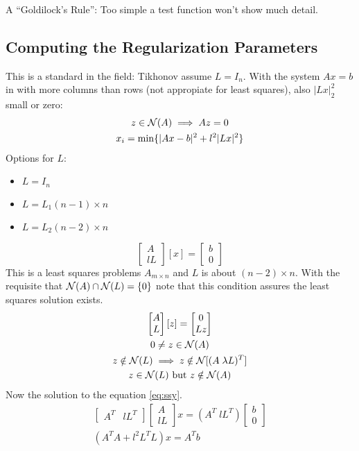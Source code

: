 A ``Goldilock's Rule'': Too simple a test function won't show much detail.\\
\subsection{Computing the Regularization Parameters}
This is a standard in the field: Tikhonov assume $L=I_n$. With the system $Ax=b$in with more columns than rows (not appropiate for least squares), also $|Lx|_2^2$ small or zero:
\begin{gather*}
z\in \mathcal{N}(A) \implies Az=0\\
x_i = \min\{|Ax-b|^2 + l^2 |Lx|^2 \}
\end{gather*}
Options for $L$:
\begin{itemize}
\item $L=I_n$
\item $L=L_1 (n-1)\times n $
\item $L=L_2 (n-2)\times n$
\end{itemize} 
\begin{equation}
\begin{bmatrix}
A \\ lL
\end{bmatrix} [x] =
\begin{bmatrix}
b \\ 0
\end{bmatrix} \label{eq:ssy}
\end{equation}
This is a least squares problems $A_{m\times n} $ and $L$ is about $(n-2)\times n$. With the requisite that $\mathcal{N}(A) \cap \mathcal{N}(L)=\{0 \}$ note that this condition assures the least squares solution exists.
\begin{gather*}
\begin{bmatrix}
A \\ L
\end{bmatrix} [z] =
\begin{bmatrix}
0 \\ Lz
\end{bmatrix} \\
0\neq z \in \mathcal{N}(A)\\
z\notin \mathcal{N}(L) \implies  z\notin \mathcal{N}[(A\; \lambda L)^T]\\
z\in \mathcal{N}(L) \text{ but } z\notin \mathcal{N}(A)
\end{gather*}
Now the solution to the equation \ref{eq:ssy}. 
\begin{gather*}
\begin{bmatrix}
A^T & lL^T
\end{bmatrix} \begin{bmatrix}
A \\ lL
\end{bmatrix}x  = (A^T \; lL^T) \begin{bmatrix} b \\ 0 \end{bmatrix}\\
(A^TA + l^2 L^T L) x = A^Tb
\end{gather*}
